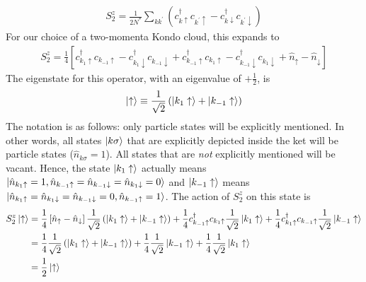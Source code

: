 \documentclass[12pt,twoside]{article}
\numberwithin{equation}{section}
\begin{document}
\begin{equation}\begin{aligned}
	S_2^z = \frac{1}{2N^*}\sum_{kk^\prime}\left(c^\dagger_{k \uparrow}c_{k^\prime \uparrow} - c^\dagger_{k \downarrow}c_{k^\prime \downarrow}\right)
\end{aligned}\end{equation}
For our choice of a two-momenta Kondo cloud, this expands to
\begin{equation}\begin{aligned}
	S_2^z = \frac{1}{4}\left[c^\dagger_{k_{1}\uparrow}c_{k_{-1} \uparrow} - c^\dagger_{k_{1}\downarrow}c_{k_{-1} \downarrow} + c^\dagger_{k_{-1}\uparrow}c_{k_{1} \uparrow} - c^\dagger_{k_{-1}\downarrow}c_{k_{1} \downarrow}+ \hat n_\uparrow - \hat n_\downarrow\right]
\end{aligned}\end{equation}
The eigenstate for this operator, with an eigenvalue of \(+ \frac{1}{2}\), is
\begin{equation}\begin{aligned}
	\ket{\uparrow} \equiv \frac{1}{\sqrt 2}\left(\ket{k_1 \uparrow} + \ket{k_{-1} \uparrow}\right)
\end{aligned}\end{equation}
The notation is as follows: only particle states will be explicitly mentioned. In other words, all states \(\ket{k\sigma}\) that are explicitly depicted inside the ket will be particle states (\(\hat n_{k\sigma}=1\)). All states that are \textit{not} explicitly mentioned will be vacant. Hence, the state \(\ket{k_1 \uparrow}\) actually means \(\ket{\hat n_{k_1 \uparrow} = 1, \hat n_{k_{-1} \uparrow} = \hat n_{k_{-1} \downarrow} = \hat n_{k_1 \downarrow} = 0}\) and \(\ket{k_{-1} \uparrow}\) means \(\ket{\hat n_{k_1 \uparrow} = \hat n_{k_1 \downarrow} = \hat n_{k_{-1} \downarrow} = 0, \hat n_{k_{-1} \uparrow} = 1}\). 
\pb The action of \(S_2^z\) on this state is
\begin{equation}\begin{aligned}
	S_2^z \ket{\uparrow} &=\frac{1}{4}\left[\hat n_\uparrow - \hat n_\downarrow\right]\frac{1}{\sqrt 2}\left(\ket{k_1 \uparrow} + \ket{k_{-1} \uparrow}\right) + \frac{1}{4}c^\dagger_{k_{-1}\uparrow}c_{k_{1} \uparrow} \frac{1}{\sqrt 2}\ket{k_1 \uparrow}+ \frac{1}{4}c^\dagger_{k_{1}\uparrow}c_{k_{-1} \uparrow}\frac{1}{\sqrt 2}\ket{k_{-1} \uparrow}\\
			     &= \frac{1}{4}\frac{1}{\sqrt 2}\left(\ket{k_1 \uparrow} + \ket{k_{-1} \uparrow}\right) + \frac{1}{4} \frac{1}{\sqrt 2}\ket{k_{-1}\uparrow} + \frac{1}{4}\frac{1}{\sqrt 2}\ket{k_{1} \uparrow}\\
			     &= \frac{1}{2}\ket{\uparrow}
\end{aligned}\end{equation}
\end{document}

